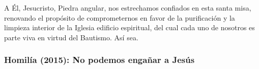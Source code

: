 \begin{body}
A Él, Jesucristo, Piedra angular, nos estrechamos confiados en esta santa misa, renovando el propósito de comprometernos en favor de la purificación y la limpieza interior de la Iglesia edificio espiritual, del cual cada uno de nosotros es parte viva en virtud del Bautismo. Así sea.
\end{body}


\subsubsection{Homilía (2015): No podemos engañar a Jesús}


